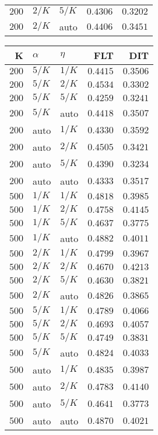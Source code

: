 \begin{table}
\begin{spacing}{1.2}
{\begin{tabular}{rll|rr}
$200$ &  $2/K$ &  $5/K$ &         $0.4306$ & $0.3202$ \\
$200$ &  $2/K$ &   auto &         $0.4406$ & $0.3451$ \\
\bottomrule
\end{tabular}
} \hfill \parbox{.45\linewidth}{\centering \begin{tabular}{rll|rr}
\toprule
    K &  $\alpha$ &    $\eta$ & FLT &        DIT \\
\midrule
$200$ &  $5/K$ &  $1/K$ &         $0.4415$ &      $0.3506$ \\
$200$ &  $5/K$ &  $2/K$ &         $0.4534$ &      $0.3302$ \\
$200$ &  $5/K$ &  $5/K$ &         $0.4259$ &      $0.3241$ \\
$200$ &  $5/K$ &   auto &         $0.4418$ &      $0.3507$ \\
$200$ &   auto &  $1/K$ &         $0.4330$ &      $0.3592$ \\
$200$ &   auto &  $2/K$ &         $0.4505$ &      $0.3421$ \\
$200$ &   auto &  $5/K$ &         $0.4390$ &      $0.3234$ \\
$200$ &   auto &   auto &         $0.4333$ &      $0.3517$ \\
$500$ &  $1/K$ &  $1/K$ &         $0.4818$ &      $0.3985$ \\
$500$ &  $1/K$ &  $2/K$ &         $0.4758$ &      $0.4145$ \\
$500$ &  $1/K$ &  $5/K$ &         $0.4637$ &      $0.3775$ \\
$500$ &  $1/K$ &   auto &    $\bm{0.4882}$ &      $0.4011$ \\
$500$ &  $2/K$ &  $1/K$ &         $0.4799$ &      $0.3967$ \\
$500$ &  $2/K$ &  $2/K$ &         $0.4670$ & $\bm{0.4213}$ \\
$500$ &  $2/K$ &  $5/K$ &         $0.4630$ &      $0.3821$ \\
$500$ &  $2/K$ &   auto &         $0.4826$ &      $0.3865$ \\
$500$ &  $5/K$ &  $1/K$ &         $0.4789$ &      $0.4066$ \\
$500$ &  $5/K$ &  $2/K$ &         $0.4693$ &      $0.4057$ \\
$500$ &  $5/K$ &  $5/K$ &         $0.4749$ &      $0.3831$ \\
$500$ &  $5/K$ &   auto &         $0.4824$ &      $0.4033$ \\
$500$ &   auto &  $1/K$ &         $0.4835$ &      $0.3987$ \\
$500$ &   auto &  $2/K$ &         $0.4783$ &      $0.4140$ \\
$500$ &   auto &  $5/K$ &         $0.4641$ &      $0.3773$ \\
$500$ &   auto &   auto &         $0.4870$ &      $0.4021$ \\
\bottomrule
\end{tabular}
}
\end{spacing}
\end{table}
